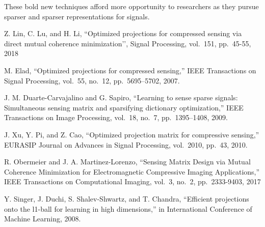 \documentclass[journal]{IEEEtran}
\begin{document}
These bold new techniques afford more opportunity to researchers as they pursue sparser and sparser
representations for signals.

\begin{thebibliography}{9}
 Z. Lin, C. Lu, and H. Li,  ``Optimized projections for compressed sensing via direct mutual coherence minimization’’, Signal Processing, vol.~151, pp.~45-55, 2018

M. Elad, “Optimized projections for compressed sensing,” IEEE Transactions on Signal Processing, vol.~55, no.~12, pp.~5695–5702, 2007.

  J. M. Duarte-Carvajalino and G. Sapiro, “Learning to sense sparse signals: Simultaneous sensing matrix and sparsifying dictionary optimization,” IEEE Transactions on Image Processing, vol.~18, no.~7, pp.~1395–1408, 2009.

J. Xu, Y. Pi, and Z. Cao, “Optimized projection matrix for compressive sensing,” EURASIP Journal on Advances in Signal Processing, vol.~2010, pp.~43, 2010.
 
  R. Obermeier and J. A. Martinez-Lorenzo, ``Sensing Matrix Design via Mutual Coherence Minimization for Electromagnetic Compressive Imaging Applications,” IEEE  Transactions on Computational Imaging, vol.~3, no.~2, pp.~2333-9403, 2017

Y. Singer, J. Duchi, S. Shalev-Shwartz, and T. Chandra, ``Efficient projections onto the l1-ball for learning in high dimensions,” in International Conference of Machine Learning, 2008.





\end{thebibliography}
\end{document}
